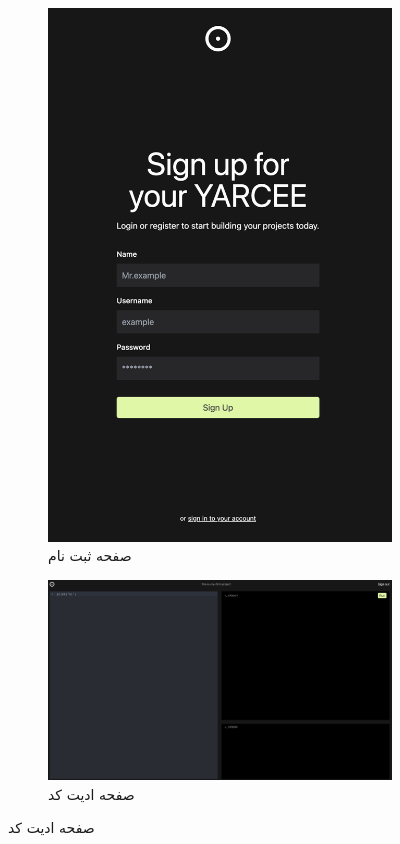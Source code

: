 \begin{figure}[htbp]
    \centering
    \begin{subfigure}[b]{0.26\textwidth}
        \centering
        \includegraphics[width=\textwidth]{./3-Design/signup.png}
        \caption{صفحه ثبت نام}
        \label{fig:signup}
    \end{subfigure}
    \hfill
    \begin{subfigure}[b]{0.70\textwidth}
        \centering
        \includegraphics[width=\textwidth]{./3-Design/editor.png}
        \caption{صفحه ادیت کد}
        \label{fig:editor}
    \end{subfigure}


\end{figure}
